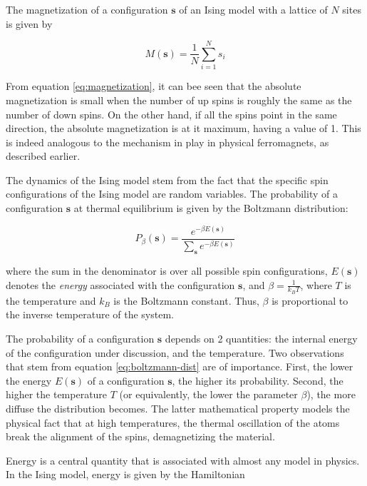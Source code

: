 \documentclass[12pt]{article}
\begin{document}
The magnetization of a configuration $\boldsymbol{s}$ of an Ising model with a lattice of $N$ sites is given by 

\begin{equation}
M(\boldsymbol{s}) = \frac{1}{N} \sum_{i=1}^N s_i
\label{eq:magnetization}
\end{equation}

From equation \ref{eq:magnetization}, it can bee seen that the absolute magnetization is small when the number of up spins is roughly the same as the number of down spins. On the other hand, if all the spins point in the same direction, the absolute magnetization is at it maximum, having a value of 1. This is indeed analogous to the mechanism in play in physical ferromagnets, as described earlier. 

The dynamics of the Ising model stem from the fact that the specific spin configurations of the Ising model are random variables. The probability of a configuration $\boldsymbol{s}$ at thermal equilibrium is given by the Boltzmann distribution: 

\begin{equation}
P_\beta(\boldsymbol{s}) = \frac{e^{-\beta E(\boldsymbol{s})}}{\sum_{\boldsymbol{s}} e^{-\beta E(\boldsymbol{s})}}
\label{eq:boltzmann-dist}
\end{equation}

where the sum in the denominator is over all possible spin configurations, $E(\boldsymbol{s})$ denotes the \textit{energy} associated with the configuration $\boldsymbol{s}$, and $\beta = \frac{1}{k_B T}$, where $T$ is the temperature and $k_B$ is the Boltzmann constant. Thus, $\beta$ is proportional to the inverse temperature of the system.  

The probability of a configuration $\boldsymbol{s}$ depends on 2 quantities: the internal energy of the configuration under discussion, and the temperature. Two observations that stem from equation \ref{eq:boltzmann-dist} are of importance. First, the lower the energy $E(\boldsymbol{s})$ of a configuration $\boldsymbol{s}$, the higher its probability. Second, the higher the temperature $T$ (or equivalently, the lower the parameter $\beta$), the more diffuse the distribution becomes. The latter mathematical property models the physical fact that at high temperatures, the thermal oscillation of the atoms break the alignment of the spins, demagnetizing the material. 

Energy is a central quantity that is associated with almost any model in physics. In the Ising model, energy is given by the Hamiltonian
\end{document}
